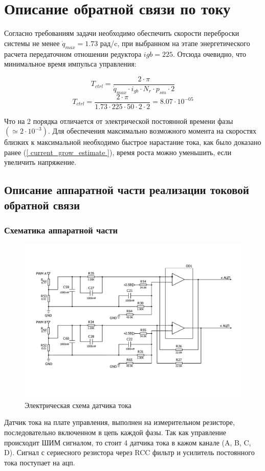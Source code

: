 \newpage
\section{ Описание обратной связи по току }
Согласно требованиям задачи необходимо обеспечить скорости переброски системы не менее 
$ \dot{q}_{max} = 1.73$ рад/c, при выбранном на этапе энергетического расчета передаточном
отношении редуктора $ i{gb} = 225 $. Отсюда очевидно, что минимальное время импульса управления:

$$
    T_{ctrl} = \frac{ 2 \cdot \pi }{ \dot{q}_{max} \cdot i_{gb} \cdot N_{r} \cdot p_{sm} \cdot 2 }
$$
$$
    T_{ctrl} = \frac{ 2 \cdot \pi }{ 1.73 \cdot 225 \cdot 50 \cdot 2 \cdot 2 } = 8.07 \cdot 10^{-05}
$$

Что на 2 порядка отличается от электрической постоянной времени фазы $( \simeq2 \cdot 10^{-3} )$.
Для обеспечения максимально возможного момента на скоростях близких к максимальной необходимо
быстрое нарастание тока, как было доказано ранее (\ref{ current_grow_estimate }), время роста можно
уменьшить, если увеличить напряжение.

\subsection{ Описание аппаратной части реализации токовой обратной связи }

\subsubsection{ Схематика аппаратной части }

\begin{figure}
\centering
\includegraphics[width=121mm, keepaspectratio]{./src/pictures/current_measuring_sheme}
\caption{Электрическая схема датчика тока}
\label{graph_speed_and_angle_comutation}
\end{figure}
Датчик тока на плате управления, выполнен на измерительном резисторе, последовательно
включенном в цепь каждой фазы. Так как управление происходит ШИМ сигналом, то стоит 4
датчика тока в кажом канале (A, B, C, D).
Сигнал с сериесного резистора через RCC фильтр и усилитель постоянного тока поступает на ацп.


